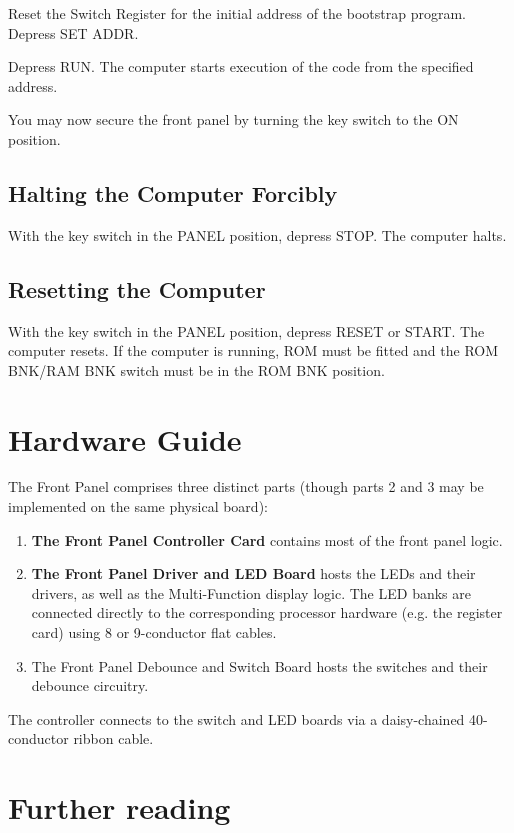 \documentclass[11pt,a4paper,twocolumns]{article}
\newcommand{\sw}[1]{\textsf{#1}}
\begin{document}
Reset the Switch Register for the initial address of the bootstrap
program. Depress \sw{SET ADDR}.

Depress \sw{RUN}. The computer starts execution of the code from the
specified address.

You may now secure the front panel by turning the key switch to the
\sw{ON} position.

\subsection{Halting the Computer Forcibly}

With the key switch in the \sw{PANEL} position, depress \sw{STOP}. The
computer halts.

\subsection{Resetting the Computer}

With the key switch in the \sw{PANEL} position, depress \sw{RESET} or
\sw{START}. The computer resets. If the computer is running, ROM must
be fitted and the \sw{ROM BNK}/\sw{RAM BNK} switch must be in the
\sw{ROM BNK} position.

\section{Hardware Guide}

The Front Panel comprises three distinct parts (though parts 2 and 3
may be implemented on the same physical board):

\begin{enumerate}
\item{\bf The Front Panel Controller Card} contains most of the front
  panel logic.
\item{\bf The Front Panel Driver and LED Board} hosts the LEDs and
  their drivers, as well as the Multi-Function display logic. The LED
  banks are connected directly to the corresponding processor hardware
  (e.g. the register card) using 8 or 9-conductor flat cables.
\item{The Front Panel Debounce and Switch Board} hosts the switches
  and their debounce circuitry.
\end{enumerate}

The controller connects to the switch and LED boards via a
daisy-chained 40-conductor ribbon cable.


\section{Further reading}
\end{document}

